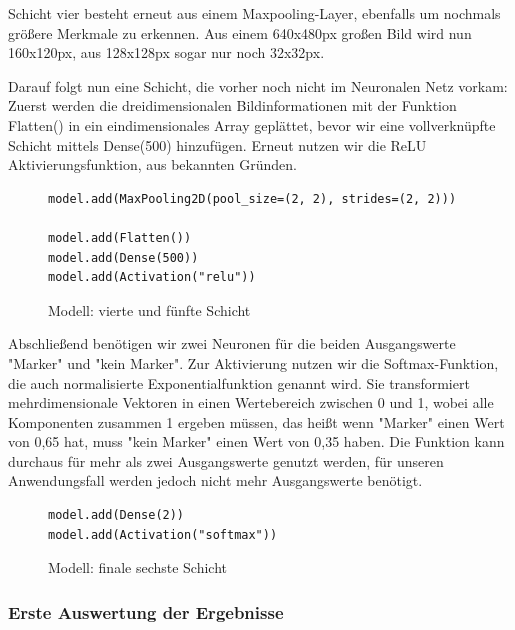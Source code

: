 \documentclass[conference]{IEEEtran}
\begin{document}
	
	Schicht vier besteht erneut aus einem Maxpooling-Layer, ebenfalls um nochmals größere Merkmale zu erkennen.
	Aus einem 640x480px großen Bild wird nun 160x120px, aus 128x128px sogar nur noch 32x32px.
	
	Darauf folgt nun eine Schicht, die vorher noch nicht im Neuronalen Netz vorkam:
	Zuerst werden die dreidimensionalen Bildinformationen mit der Funktion Flatten() in ein eindimensionales Array geplättet, bevor wir eine vollverknüpfte Schicht mittels Dense(500) hinzufügen.
	Erneut nutzen wir die ReLU Aktivierungsfunktion, aus bekannten Gründen.
	
	\begin{figure}[!h]
		\centering
		\begin{verbatim}
model.add(MaxPooling2D(pool_size=(2, 2), strides=(2, 2)))

model.add(Flatten())
model.add(Dense(500))
model.add(Activation("relu"))
		\end{verbatim}
		\caption{Modell: vierte und fünfte Schicht}
		\label{Schicht vier und fünf}
	\end{figure}
	
	Abschließend benötigen wir zwei Neuronen für die beiden Ausgangswerte "Marker" und "kein Marker".
	Zur Aktivierung nutzen wir die Softmax-Funktion, die auch normalisierte Exponentialfunktion genannt wird.
	Sie transformiert mehrdimensionale Vektoren in einen Wertebereich zwischen 0 und 1, wobei alle Komponenten zusammen 1 ergeben müssen, das heißt wenn "Marker" einen Wert von 0,65 hat, muss "kein Marker" einen Wert von 0,35 haben. 
	Die Funktion kann durchaus für mehr als zwei Ausgangswerte genutzt werden, für unseren Anwendungsfall werden jedoch nicht mehr Ausgangswerte benötigt.
	
	\begin{figure}[!h]
		\centering
		\begin{verbatim}
model.add(Dense(2))
model.add(Activation("softmax"))
		\end{verbatim}
		\caption{Modell: finale sechste Schicht}
		\label{Schicht sechs}
	\end{figure}

	\subsubsection{Erste Auswertung der Ergebnisse}	%
\end{document}
